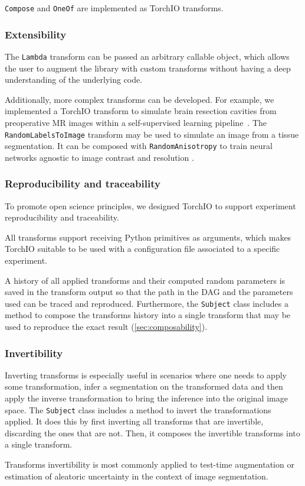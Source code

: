 \texttt{Compose} and \texttt{OneOf} are implemented as TorchIO
transforms.


\subsubsection{Extensibility}

The \texttt{Lambda} transform can be passed an arbitrary callable object, which
allows the user to augment the library with custom transforms without having
a deep understanding of the underlying code.


Additionally, more complex transforms can be developed.
%
For example, we implemented a TorchIO transform to simulate brain resection
cavities from preoperative MR images within a self-supervised learning
pipeline~\cite{perez-garcia_simulation_2020}.
%
The \texttt{RandomLabelsToImage} transform may be used to simulate an image from
a tissue segmentation.
%
It can be composed with \texttt{RandomAnisotropy} to train neural networks
agnostic to image contrast and
resolution \cite{billot_learning_2020, billot_partial_2020,iglesias_joint_2020}.


\subsubsection{Reproducibility and traceability}

To promote open science principles, we designed TorchIO to support experiment
reproducibility and traceability.


All transforms support receiving Python primitives as arguments,
which makes TorchIO suitable to be used with a configuration file associated to
a specific experiment.


A history of all applied transforms and their computed
random parameters is saved in the transform output so that the path in the
\ac{DAG} and the parameters used can be traced and reproduced.
%
Furthermore, the \texttt{Subject} class includes a method to compose the
transforms history into a single transform that may be used to reproduce the
exact result (\cref{sec:composability}).


\subsubsection{Invertibility}

Inverting transforms is especially useful in scenarios where one needs to
apply some transformation, infer a segmentation on the transformed data and
then apply the inverse transformation to bring the inference into the original image space.
%
The \texttt{Subject} class includes a method to invert the transformations applied.
%
It does this by first inverting all transforms that are invertible, discarding the ones that are not.
%
Then, it composes the invertible transforms into a single transform.


Transforms invertibility is most commonly applied to
test-time augmentation \cite{moshkov_test-time_2020}
or estimation of aleatoric uncertainty \cite{wang_aleatoric_2019}
in the context of image segmentation.